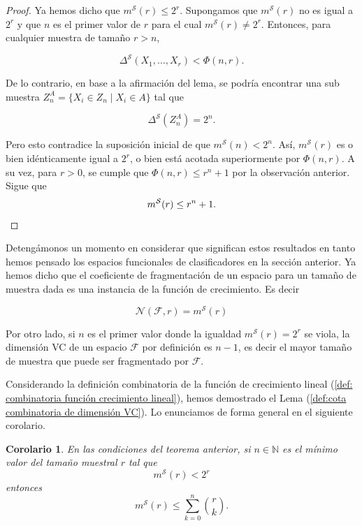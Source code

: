\documentclass{report}
\newtheorem{cor}{Corolario}[thm]
\begin{document}
\begin{proof}
Ya hemos dicho que \( m^{\mathcal{S}}(r) \leq 2^r \). Supongamos que \( m^{\mathcal{S}}(r) \) no es 
 igual a \( 2^r \) y que \( n \) es el primer valor de \( r \) para el cual \( m^{\mathcal{S}}(r) \neq 2^r \). 
    Entonces, para cualquier muestra de tamaño \( r > n \),
    
    \[
    \Delta^{\mathcal{S}}(X_1, \dots, X_r) < \Phi(n, r).
    \]
    
    De lo contrario, en base a la afirmación del lema, se podría encontrar una sub muestra  
    \( Z_n^A = \{X_i \in Z_n \mid X_i \in A\} \) tal que  
    
    \[
    \Delta^{\mathcal{S}}\left(Z_n^A\right) = 2^n.
    \]
    
  Pero esto contradice la suposición inicial de que \( m^{\mathcal{S}}(n) < 2^n \).  
    Así, \( m^{\mathcal{S}}(r) \) es o bien idénticamente igual a \( 2^r \), o bien está acotada superiormente 
    por \( \Phi(n, r) \). A su vez, para \( r > 0 \), se cumple que \( \Phi(n, r) \leq r^n + 1 \) por la observación
    anterior. Sigue que 
    \[
        m^{\mathcal{S}}(r)   \leq r^n + 1.\newline
    \]
    
\end{proof}


Detengámonos un momento en considerar que significan estos resultados en tanto hemos pensado los espacios funcionales
de clasificadores en la sección anterior. Ya hemos dicho que el coeficiente de fragmentación de un espacio para un tamaño
de muestra dada es una instancia de la función de crecimiento. Es decir

\[
\mathcal{N}(\mathcal{F}, r) = m^{\mathcal{S}}(r)
\]

Por otro lado, si $n$ es el primer valor donde la igualdad $m^{\mathcal{S}}(r)=2^r$ se viola, la dimensión VC de un espacio $\mathcal{F}$ 
por definición es $n-1$, es decir el mayor tamaño de muestra que puede ser fragmentado por $\mathcal{F}$.\newline

Considerando la definición combinatoria de la función de crecimiento lineal (\ref{def: combinatoria función crecimiento lineal}),
hemos demostrado el Lema (\ref{def:cota combinatoria de dimensión VC}). Lo enunciamos de forma general en el siguiente corolario.

\begin{cor}
    En las condiciones del teorema anterior, si $n\in\mathbb{N}$ es el mínimo valor del tamaño muestral $r$ tal que    
    \[
        m^{\mathcal{S}}(r) < 2^r
    \]
    entonces
    \[
        m^{\mathcal{S}}(r) \leq \sum\limits_{k=0}^{n} \binom{r}{k}. 
    \]
\end{cor}
\end{document}
